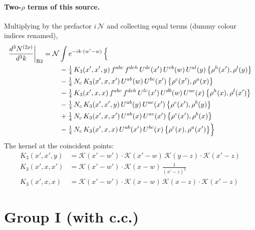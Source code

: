 \documentclass[10pt]{article}
\numberwithin{equation}{section}
\newcommand{\KK}{\mathcal K}
\newcommand{\NN}{\mathcal N}
\begin{document}
\paragraph{Two-$\rho$ terms of this source.} Multiplying by the prefactor $i\,\NN$ and collecting equal terms (dummy colour indices renamed),
\begin{align}
\frac{d^3N^{(2\rho)}}{d^3k}\bigg|_{\rm B2}={}&\NN\int e^{-ik\cdot(w'-w)}\,\Big\{\notag\\
&\quad -\tfrac14\,K_3(x',x',y)\,f^{abc}\,f^{deh}\,U^{dc}(x')\,U^{eb}(w)\,U^{al}(y)\,\big\{\rho^{h}(x'),\rho^{l}(y)\big\}\notag\\
&\quad -\tfrac14\,N_{c}\,K_3(x',x,x')\,U^{ab}(w)\,U^{bc}(x')\,\big\{\rho^{c}(x'),\rho^{a}(x)\big\}\notag\\
&\quad -\tfrac14\,K_3(x',x,x)\,f^{abc}\,f^{deh}\,U^{lc}(x')\,U^{db}(w)\,U^{ae}(x)\,\big\{\rho^{h}(x),\rho^{l}(x')\big\}\notag\\
&\quad -\tfrac14\,N_{c}\,K_3(x',x',y)\,U^{ab}(y)\,U^{ac}(x')\,\big\{\rho^{c}(x'),\rho^{b}(y)\big\}\notag\\
&\quad +\tfrac14\,N_{c}\,K_3(x',x,x')\,U^{ab}(x)\,U^{ac}(x')\,\big\{\rho^{c}(x'),\rho^{b}(x)\big\}\notag\\
&\quad -\tfrac14\,N_{c}\,K_3(x',x,x)\,U^{ab}(x')\,U^{bc}(x)\,\big\{\rho^{c}(x),\rho^{a}(x')\big\}\Big\}\label{eq:res-B2}
\end{align}
The kernel at the coincident points:
\begin{align*}
K_3(x',x',y)&=\KK(x'-w')\cdot\KK(x'-w)\,\KK(y-z)\cdot\KK(x'-z)\\K_3(x',x,x')&=\KK(x'-w')\cdot\KK(x-w)\,\frac{1}{(x'-z)^2}\\K_3(x',x,x)&=\KK(x'-w')\cdot\KK(x-w)\,\KK(x-z)\cdot\KK(x'-z)
\end{align*}
\section{Group I (with c.c.)}\label{sec:G1}
\end{document}
